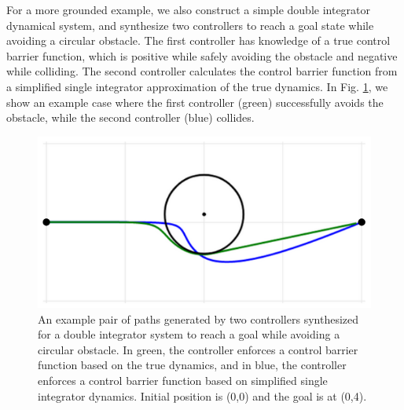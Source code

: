 \documentclass{amsart}
\begin{document}
For a more grounded example, we also construct a simple double integrator dynamical system, and synthesize two controllers to reach a goal state while avoiding a circular obstacle. The first controller has knowledge of a true control barrier function, which is positive while safely avoiding the obstacle and negative while colliding. The second controller calculates the control barrier function from a simplified single integrator approximation of the true dynamics. In Fig. \ref{fig:expdemo}, we show an example case where the first controller (green) successfully avoids the obstacle, while the second controller (blue) collides.

\begin{figure}[htbp]
        \centerline{\includegraphics[width=0.9\columnwidth]{img/exp_demo.png}}
        \caption{An example pair of paths generated by two controllers synthesized for a double integrator system to reach a goal while avoiding a circular obstacle. In green, the controller enforces a control barrier function based on the true dynamics, and in blue, the controller enforces a control barrier function based on simplified single integrator dynamics. Initial position is (0,0) and the goal is at (0,4).}
        \label{fig:expdemo}
\end{figure}
\end{document}
